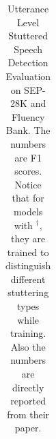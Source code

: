 \begin{table}
\begin{tabular}{lcccccccc}
\bottomrule
\end{tabular}
\caption{Utterance Level Stuttered Speech Detection Evaluation on SEP-28K and Fluency Bank. The numbers are F1 scores.
Notice that for models with $^\dagger$, they are trained to distinguish different stuttering types while training. Also the numbers are directly reported from their paper.}
\label{tab:Utt_level}
\vspace{-5pt}
\end{table}
